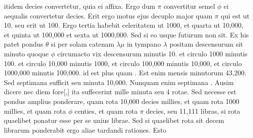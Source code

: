 itidem decies convertetur, quia ei affixa.
Ergo dum $\displaystyle \pi$ convertitur semel $\displaystyle \phi$ ei aequalis convertetur
decies. Erit ergo motus ejus decuplo major quam $\displaystyle \pi$ qui est
ut 10. seu erit ut 100. Ergo tertia habebit
celeritatem\protect{}
ut 1000, et quarta ut 10,000, et quinta ut 100,000
et sexta ut 1000,000. Sed si eo usque
futurum non sit.
Ex his patet pondus\protect{} $\displaystyle \theta$ si
per solam catenam\protect{} $\displaystyle \lambda\mu$ in tympano\protect{} $\displaystyle \lambda$ positam
descensurum sit minuto
quoque $\displaystyle \phi$ circumacto vix descensurum minutis 10. et
circulo 1000 minutis 100. et circulo 10,000 minutis 1000, et 
circulo 100,000 minutis 10,000, et circulo 1000,000 minutis 
100,000. id est plus quam
.
Est enim mensis minutorum 43,200.
Sed septimana sufficit seu minuta 10,000. 
Nunquam enim septimana
.
Ausim dicere nec
diem fore[,] ita suffecerint mille minuta seu 4 rotae.\protect{}
Sed necesse est pondus\protect{} amplius ponderare, quam rota 10,000 decies
millies, et quam rota 1000 millies, et quam rota $\displaystyle \phi$ centies, et
quam rota $\displaystyle \pi$ decies, seu 11,111 libras, si rota quaelibet ponatur
esse per se unius librae. Sed si quaelibet rota\protect{} sit decem librarum
ponderabit 
ergo aliae tardandi rationes. Esto

